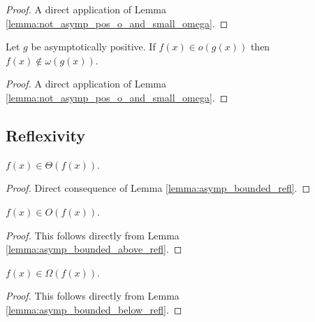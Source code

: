 \begin{proof}
    \leanok
    A direct application of Lemma \ref{lemma:not_asymp_pos_o_and_small_omega}.
\end{proof}

\begin{lemma}
    \label{lemma:not_asymp_pos_o_of_small_omega}
    \leanok
    Let $g$ be asymptotically positive. If $f(x) \in o(g(x))$ then $f(x) \notin \omega(g(x))$.
\end{lemma}

\begin{proof}
    \leanok
    A direct application of Lemma \ref{lemma:not_asymp_pos_o_and_small_omega}.
\end{proof}


\subsection{Reflexivity}

\begin{lemma}
    \label{lemma:theta_refl}
    \leanok
    $f(x) \in \Theta(f(x))$.

\end{lemma}

\begin{proof}
    \leanok
    Direct consequence of Lemma \ref{lemma:asymp_bounded_refl}.
\end{proof}

\begin{lemma}
    \label{lemma:big_o_refl}
    \leanok
    $f(x) \in O(f(x))$.
\end{lemma}

\begin{proof}
    \leanok
    This follows directly from Lemma \ref{lemma:asymp_bounded_above_refl}.
\end{proof}

\begin{lemma}
    \label{lemma:big_omega_refl}
    \leanok
    $f(x) \in \Omega(f(x))$.
\end{lemma}

\begin{proof}
    \leanok
    This follows directly from Lemma \ref{lemma:asymp_bounded_below_refl}.
\end{proof}


